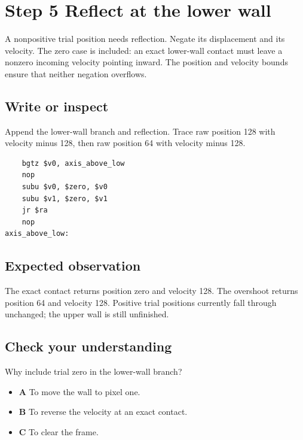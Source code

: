 \section{Step 5 Reflect at the lower wall}\label{ball-s05}

A nonpositive trial position needs reflection. Negate its displacement and its velocity. The zero case is included: an exact lower-wall contact must leave a nonzero incoming velocity pointing inward. The position and velocity bounds ensure that neither negation overflows.

\subsection{Write or inspect}
Append the lower-wall branch and reflection. Trace raw position 128 with velocity minus 128, then raw position 64 with velocity minus 128.

\begin{verbatim}
    bgtz $v0, axis_above_low
    nop
    subu $v0, $zero, $v0
    subu $v1, $zero, $v1
    jr $ra
    nop
axis_above_low:
\end{verbatim}

\subsection{Expected observation}
The exact contact returns position zero and velocity 128. The overshoot returns position 64 and velocity 128. Positive trial positions currently fall through unchanged; the upper wall is still unfinished.

\subsection{Check your understanding}
Why include trial zero in the lower-wall branch?

\begin{itemize}
  \item \textbf{A} To move the wall to pixel one.
  \item \textbf{B} To reverse the velocity at an exact contact.
  \item \textbf{C} To clear the frame.
\end{itemize}
